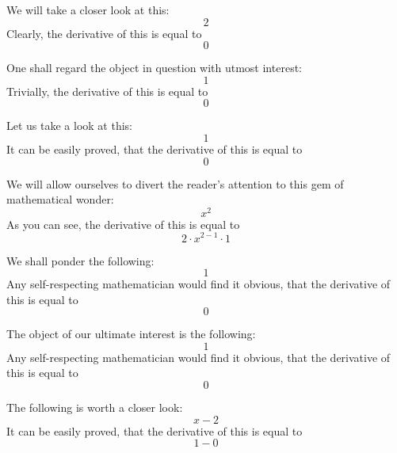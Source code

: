 \documentclass{article}
\begin{document}
We will take a closer look at this:
\begin{equation}
2 
\end{equation}
Clearly, the derivative of this is equal to
\begin{equation}
0 
\end{equation}

One shall regard the object in question with utmost interest:
\begin{equation}
1 
\end{equation}
Trivially, the derivative of this is equal to
\begin{equation}
0 
\end{equation}

Let us take a look at this:
\begin{equation}
1 
\end{equation}
It can be easily proved, that the derivative of this is equal to
\begin{equation}
0 
\end{equation}

We will allow ourselves to divert the reader's attention to this gem of mathematical wonder:
\begin{equation}
x ^{2 } 
\end{equation}
As you can see, the derivative of this is equal to
\begin{equation}
2 \cdot x ^{2 - 1 } \cdot 1 
\end{equation}

We shall ponder the following:
\begin{equation}
1 
\end{equation}
Any self-respecting mathematician would find it obvious, that the derivative of this is equal to
\begin{equation}
0 
\end{equation}

The object of our ultimate interest is the following:
\begin{equation}
1 
\end{equation}
Any self-respecting mathematician would find it obvious, that the derivative of this is equal to
\begin{equation}
0 
\end{equation}

The following is worth a closer look:
\begin{equation}
x - 2 
\end{equation}
It can be easily proved, that the derivative of this is equal to
\begin{equation}
1 - 0 
\end{equation}
\end{document}
